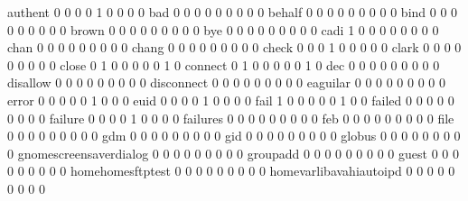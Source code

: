 \documentclass[compress,8pt]{beamer}
\begin{document}
\begin{frame}
\begin{Schunk}
  authent                                    0   0   0   0   1   0   0   0   0
  bad                                        0   0   0   0   0   0   0   0   0
  behalf                                     0   0   0   0   0   0   0   0   0
  bind                                       0   0   0   0   0   0   0   0   0
  brown                                      0   0   0   0   0   0   0   0   0
  bye                                        0   0   0   0   0   0   0   0   0
  cadi                                       1   0   0   0   0   0   0   0   0
  chan                                       0   0   0   0   0   0   0   0   0
  chang                                      0   0   0   0   0   0   0   0   0
  check                                      0   0   0   1   0   0   0   0   0
  clark                                      0   0   0   0   0   0   0   0   0
  close                                      0   1   0   0   0   0   0   1   0
  connect                                    0   1   0   0   0   0   0   1   0
  dec                                        0   0   0   0   0   0   0   0   0
  disallow                                   0   0   0   0   0   0   0   0   0
  disconnect                                 0   0   0   0   0   0   0   0   0
  eaguilar                                   0   0   0   0   0   0   0   0   0
  error                                      0   0   0   0   0   1   0   0   0
  euid                                       0   0   0   0   1   0   0   0   0
  fail                                       1   0   0   0   0   0   1   0   0
  failed                                     0   0   0   0   0   0   0   0   0
  failure                                    0   0   0   0   1   0   0   0   0
  failures                                   0   0   0   0   0   0   0   0   0
  feb                                        0   0   0   0   0   0   0   0   0
  file                                       0   0   0   0   0   0   0   0   0
  gdm                                        0   0   0   0   0   0   0   0   0
  gid                                        0   0   0   0   0   0   0   0   0
  globus                                     0   0   0   0   0   0   0   0   0
  gnomescreensaverdialog                     0   0   0   0   0   0   0   0   0
  groupadd                                   0   0   0   0   0   0   0   0   0
  guest                                      0   0   0   0   0   0   0   0   0
  homehomesftptest                           0   0   0   0   0   0   0   0   0
  homevarlibavahiautoipd                     0   0   0   0   0   0   0   0   0

\end{Schunk}
\end{frame}
\end{document}

